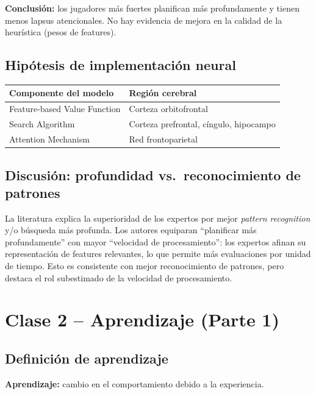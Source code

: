 \documentclass[11pt, a4paper]{article}
\begin{document}
\textbf{Conclusi\'on:} los jugadores m\'as fuertes planifican m\'as profundamente y tienen menos lapsus atencionales. No hay evidencia de mejora en la calidad de la heur\'istica (pesos de features).

\subsection{Hip\'otesis de implementaci\'on neural}

\begin{center}
\begin{tabular}{ll}
\hline
\textbf{Componente del modelo} & \textbf{Regi\'on cerebral} \\
\hline
Feature-based Value Function & Corteza orbitofrontal \\
Search Algorithm & Corteza prefrontal, c\'ingulo, hipocampo \\
Attention Mechanism & Red frontoparietal \\
\hline
\end{tabular}
\end{center}

\subsection{Discusi\'on: profundidad vs.\ reconocimiento de patrones}

La literatura explica la superioridad de los expertos por mejor \emph{pattern recognition} y/o b\'usqueda m\'as profunda. Los autores equiparan ``planificar m\'as profundamente'' con mayor ``velocidad de procesamiento'': los expertos afinan su representaci\'on de features relevantes, lo que permite m\'as evaluaciones por unidad de tiempo. Esto es consistente con mejor reconocimiento de patrones, pero destaca el rol subestimado de la velocidad de procesamiento.

\section{Clase 2 -- Aprendizaje (Parte 1)}

\subsection{Definici\'on de aprendizaje}

\textbf{Aprendizaje:} cambio en el comportamiento debido a la experiencia.
\end{document}

